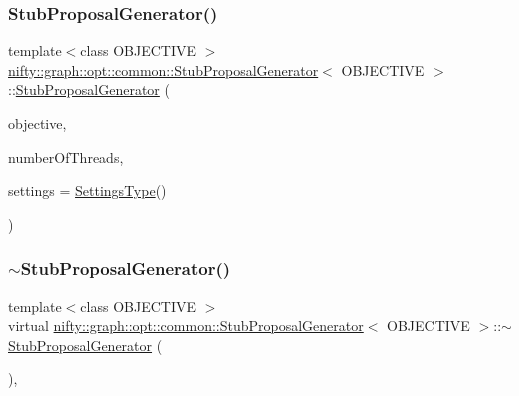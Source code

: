 \subsubsection{\texorpdfstring{Stub\+Proposal\+Generator()}{StubProposalGenerator()}}
{\footnotesize\ttfamily template$<$class O\+B\+J\+E\+C\+T\+I\+VE $>$ \\
\hyperlink{classnifty_1_1graph_1_1opt_1_1common_1_1StubProposalGenerator}{nifty\+::graph\+::opt\+::common\+::\+Stub\+Proposal\+Generator}$<$ O\+B\+J\+E\+C\+T\+I\+VE $>$\+::\hyperlink{classnifty_1_1graph_1_1opt_1_1common_1_1StubProposalGenerator}{Stub\+Proposal\+Generator} (\begin{DoxyParamCaption}\item[{const \hyperlink{classnifty_1_1graph_1_1opt_1_1common_1_1StubProposalGenerator_a1f69fccabf6f79294d35a1ea47261f3a}{Objective\+Type} \&}]{objective,  }\item[{const size\+\_\+t}]{number\+Of\+Threads,  }\item[{const \hyperlink{structnifty_1_1graph_1_1opt_1_1common_1_1StubProposalGenerator_1_1SettingsType}{Settings\+Type} \&}]{settings = {\ttfamily \hyperlink{structnifty_1_1graph_1_1opt_1_1common_1_1StubProposalGenerator_1_1SettingsType}{Settings\+Type}()} }\end{DoxyParamCaption})\hspace{0.3cm}{\ttfamily [inline]}}

\mbox{\label{classnifty_1_1graph_1_1opt_1_1common_1_1StubProposalGenerator_adfac393e8c0cd4fbe891772e8ceaf864}} 
\subsubsection{\texorpdfstring{$\sim$\+Stub\+Proposal\+Generator()}{~StubProposalGenerator()}}
{\footnotesize\ttfamily template$<$class O\+B\+J\+E\+C\+T\+I\+VE $>$ \\
virtual \hyperlink{classnifty_1_1graph_1_1opt_1_1common_1_1StubProposalGenerator}{nifty\+::graph\+::opt\+::common\+::\+Stub\+Proposal\+Generator}$<$ O\+B\+J\+E\+C\+T\+I\+VE $>$\+::$\sim$\hyperlink{classnifty_1_1graph_1_1opt_1_1common_1_1StubProposalGenerator}{Stub\+Proposal\+Generator} (\begin{DoxyParamCaption}{ }\end{DoxyParamCaption})\hspace{0.3cm}{\ttfamily [inline]}, {\ttfamily [virtual]}}



